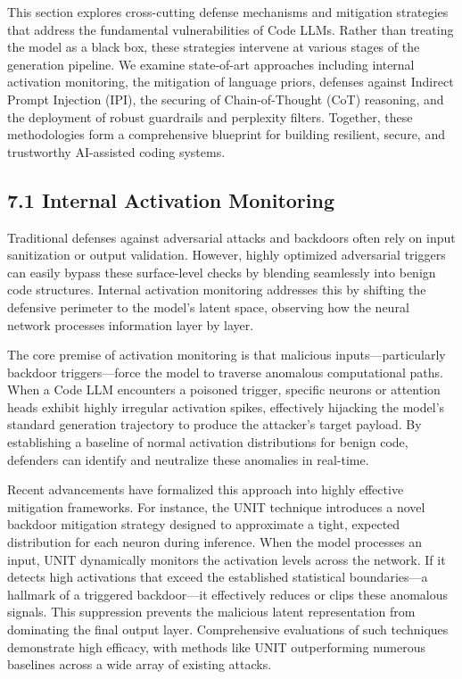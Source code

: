 \documentclass[11pt,a4paper]{article}
\begin{document}
This section explores cross-cutting defense mechanisms and mitigation strategies that address the fundamental vulnerabilities of Code LLMs. Rather than treating the model as a black box, these strategies intervene at various stages of the generation pipeline. We examine state-of-art approaches including internal activation monitoring, the mitigation of language priors, defenses against Indirect Prompt Injection (IPI), the securing of Chain-of-Thought (CoT) reasoning, and the deployment of robust guardrails and perplexity filters. Together, these methodologies form a comprehensive blueprint for building resilient, secure, and trustworthy AI-assisted coding systems.

\subsection{7.1 Internal Activation Monitoring}

Traditional defenses against adversarial attacks and backdoors often rely on input sanitization or output validation. However, highly optimized adversarial triggers can easily bypass these surface-level checks by blending seamlessly into benign code structures. Internal activation monitoring addresses this by shifting the defensive perimeter to the model’s latent space, observing how the neural network processes information layer by layer.

The core premise of activation monitoring is that malicious inputs---particularly backdoor triggers---force the model to traverse anomalous computational paths. When a Code LLM encounters a poisoned trigger, specific neurons or attention heads exhibit highly irregular activation spikes, effectively hijacking the model's standard generation trajectory to produce the attacker's target payload. By establishing a baseline of normal activation distributions for benign code, defenders can identify and neutralize these anomalies in real-time.

Recent advancements have formalized this approach into highly effective mitigation frameworks. For instance, the UNIT technique introduces a novel backdoor mitigation strategy designed to approximate a tight, expected distribution for each neuron during inference. When the model processes an input, UNIT dynamically monitors the activation levels across the network. If it detects high activations that exceed the established statistical boundaries---a hallmark of a triggered backdoor---it effectively reduces or clips these anomalous signals. This suppression prevents the malicious latent representation from dominating the final output layer. Comprehensive evaluations of such techniques demonstrate high efficacy, with methods like UNIT outperforming numerous baselines across a wide array of existing attacks. 
\end{document}

